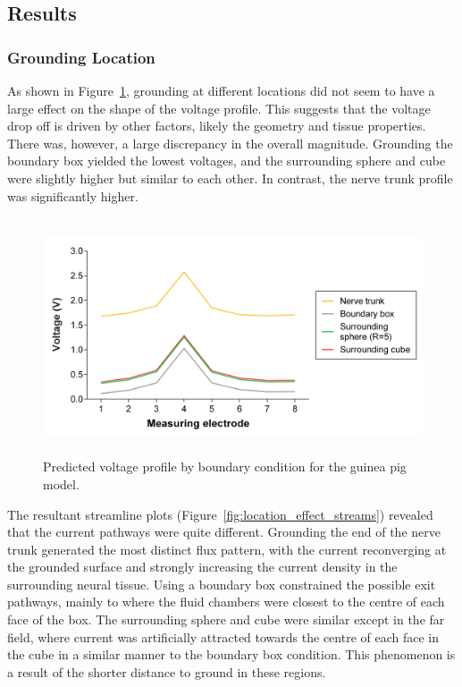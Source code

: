 \subsection{Results}

\subsubsection{Grounding Location}

As shown in Figure~\ref{fig:location_effect_volt}, grounding at different
locations did not seem to have a large effect on the shape of the voltage
profile. This suggests that the voltage drop off is driven by other factors,
likely the geometry and tissue properties. There was, however, a large
discrepancy in the overall magnitude. Grounding the boundary box yielded the
lowest voltages, and the surrounding sphere and cube were slightly higher but
similar to each other. In contrast, the nerve trunk profile was significantly
higher.

\begin{figure}
	\centering
	\includegraphics[height=7cm]{Simulations/BCs/bc_redux_shape}
	\caption[Predicted voltage profile by boundary condition]{Predicted voltage
	profile by boundary condition for the guinea pig model.}
	\label{fig:location_effect_volt}
\end{figure}

The resultant streamline plots (Figure~\ref{fig:location_effect_streams})
revealed that the current pathways were quite different. Grounding the end of
the nerve trunk generated the most distinct flux pattern, with the current
reconverging at the grounded surface and strongly increasing the current density
in the surrounding neural tissue. Using a boundary box constrained the possible
exit pathways, mainly to where the fluid chambers were closest to the centre of
each face of the box. The surrounding sphere and cube were similar except in the
far field, where current was artificially attracted towards the centre of each
face in the cube in a similar manner to the boundary box condition. This
phenomenon is a result of the shorter distance to ground in these regions.

